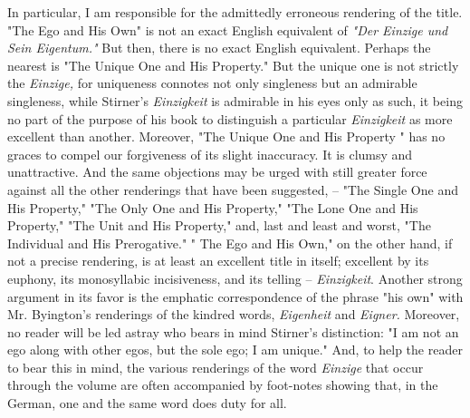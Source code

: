 \documentclass[a4paper]{book}
\begin{document}
In particular, I am responsible for the admittedly erroneous rendering of the 
title. "{}The Ego and His Own"{} is not an exact English equivalent of 
\textit{"{}Der Einzige und Sein Eigentum."{}} But then, there is no exact 
English equivalent. Perhaps the nearest is "{}The Unique One and His 
Property."{} But the unique one is not strictly the \textit{Einzige,} for 
uniqueness connotes not only singleness but an admirable singleness, while 
Stirner's \textit{Einzigkeit} is admirable in his eyes only as such, it being 
no part of the purpose of his book to distinguish a particular 
\textit{Einzigkeit} as more excellent than another. Moreover, "{}The Unique 
One and His Property "{} has no graces to compel our forgiveness of its slight 
inaccuracy. It is clumsy and unattractive. And the same objections may be 
urged with still greater force against all the other renderings that have been 
suggested, -- "{}The Single One and His Property,"{} "{}The Only One and His 
Property,"{} "{}The Lone One and His Property,"{} "{}The Unit and His 
Property,"{} and, last and least and worst, "{}The Individual and His 
Prerogative."{} "{} The Ego and His Own,"{} on the other hand, if not a 
precise rendering, is at least an excellent title in itself; excellent by its 
euphony, its monosyllabic incisiveness, and its telling -- 
\textit{Einzigkeit}. Another strong argument in its favor is the emphatic 
correspondence of the phrase "{}his own"{} with Mr. Byington's renderings of 
the kindred words, \textit{Eigenheit} and \textit{Eigner.} Moreover, no reader 
will be led astray who bears in mind Stirner's distinction: "{}I am not an ego 
along with other egos, but the sole ego; I am unique."{} And, to help the 
reader to bear this in mind, the various renderings of the word 
\textit{Einzige} that occur through the volume are often accompanied by 
foot-notes showing that, in the German, one and the same word does duty for 
all.
\end{document}
